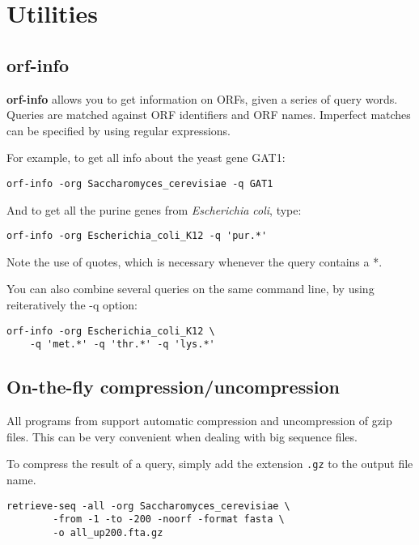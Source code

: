 \section{Utilities}

\subsection{orf-info}

\textbf{orf-info} allows you to get information on ORFs, given a series of
query words. Queries are matched against ORF identifiers and ORF
names. Imperfect matches can be specified by using regular
expressions.

For example, to get all info about the yeast gene GAT1:

\begin{verbatim}
orf-info -org Saccharomyces_cerevisiae -q GAT1
\end{verbatim}

And to get all the purine genes from \textit{Escherichia coli}, type: 

\begin{verbatim}
orf-info -org Escherichia_coli_K12 -q 'pur.*'
\end{verbatim}

Note the use of quotes, which is necessary whenever the query contains
a *.

You can also combine several queries on the same command line, by
using reiteratively the -q option:

\begin{verbatim}
orf-info -org Escherichia_coli_K12 \
    -q 'met.*' -q 'thr.*' -q 'lys.*'
\end{verbatim}

\subsection{On-the-fly compression/uncompression}
All programs from \RSAT support automatic compression and
uncompression of gzip files. This can be very convenient when dealing
with big sequence files.

To compress the result of a query, simply add the extension
\texttt{.gz} to the output file name.

\begin{verbatim}
retrieve-seq -all -org Saccharomyces_cerevisiae \
        -from -1 -to -200 -noorf -format fasta \
        -o all_up200.fta.gz
\end{verbatim}


